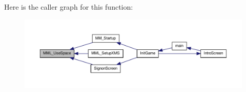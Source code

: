 Here is the caller graph for this function:
\nopagebreak
\begin{figure}[H]
\begin{center}
\leavevmode
\includegraphics[width=400pt]{ID__MM_8C_abf7ebac49c519babe994fbe8bb070d04_icgraph}
\end{center}
\end{figure}




